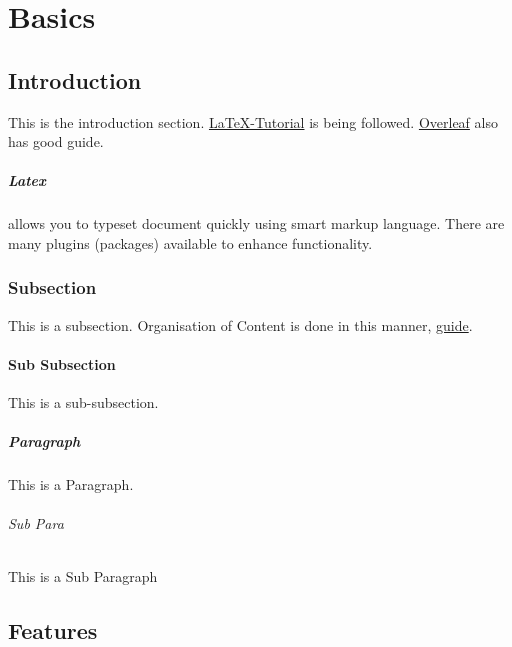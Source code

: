 \documentclass{report}[a4paper,12pt] %
\begin{document}
  \maketitle %
  \newpage %
  \tableofcontents

\chapter{Basics} %
\section{Introduction}
This is the introduction section.
\href{http://www.latex-tutorial.com}{LaTeX-Tutorial} is being followed.
\href{https://www.overleaf.com/learn}{Overleaf} also has good guide.

\paragraph*{Latex} allows you to typeset document quickly using smart markup language.
There are many plugins (packages) available to enhance functionality.

\subsection{Subsection}
This is a subsection.  
Organisation of Content is done in this manner, \href{https://www.overleaf.com/learn/latex/Sections_and_chapters}{guide}.

\subsubsection{Sub Subsection}
This is a sub-subsection.

\paragraph{Paragraph} 
This is a Paragraph.

\subparagraph{Sub Para}
This is a Sub Paragraph

\section{Features}
\end{document}
